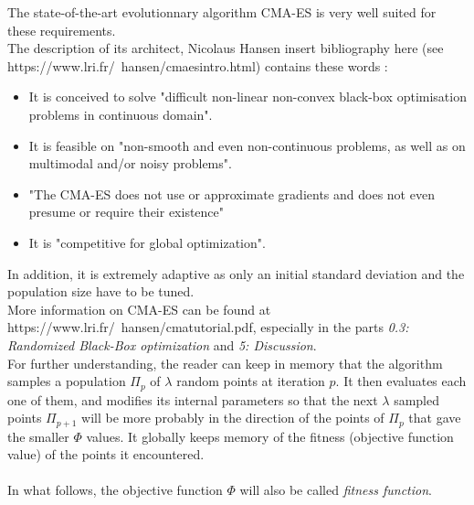 The state-of-the-art evolutionnary algorithm CMA-ES is very well suited for these requirements.\\
The description of its architect, Nicolaus Hansen \color{blue}insert bibliography here\color{black} (see https://www.lri.fr/~hansen/cmaesintro.html) contains these words :
\begin{itemize}
	\item It is conceived to solve "difficult non-linear non-convex black-box optimisation problems in continuous domain". 
	\item It is feasible on "non-smooth and even non-continuous problems, as well as on multimodal and/or noisy problems".
	\item "The CMA-ES does not use or approximate gradients and does not even presume or require their existence"
	\item It is "competitive for global optimization".
\end{itemize}
In addition, it is extremely adaptive as only an initial standard deviation and the population size have to be tuned.\\
More information on CMA-ES can be found at https://www.lri.fr/~hansen/cmatutorial.pdf, especially in the parts \emph{0.3: Randomized Black-Box optimization} and \emph{5: Discussion}.\\
For further understanding, the reader can keep in memory that the algorithm samples a population $\Pi_{p}$ of $\lambda$ random points at iteration $p$. It then evaluates each one of them, and modifies its internal parameters so that the next $\lambda$ sampled points $\Pi_{p+1}$ will be more probably in the direction of the points of $\Pi_{p}$ that gave the smaller $\Phi$ values. It globally keeps memory of the fitness (objective function value) of the points it encountered.\\
\\
In what follows, the objective function $\Phi$ will also be called \emph{fitness function}.

